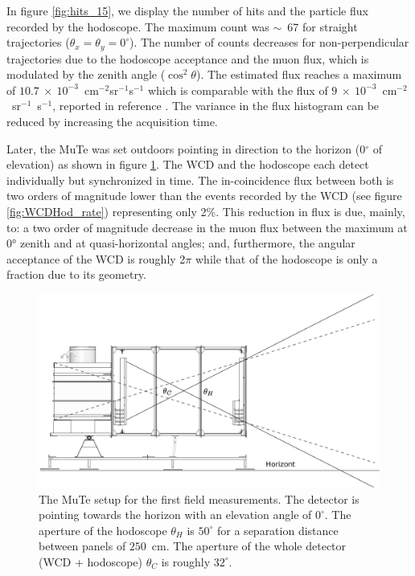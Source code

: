 \documentclass[letterpaper,11pt]{article}
\begin{document}
In figure \ref{fig:hits_15}, we display the number of hits and the particle flux recorded by the hodoscope. The maximum count was $\sim$~67 for straight trajectories ($\theta_x=\theta_y=0^{\circ}$). The number of counts decreases for non-perpendicular trajectories due to the hodoscope acceptance and the muon flux, which is modulated by the zenith angle ($\cos^2 \theta$). The estimated flux reaches a maximum of $10.7~\times~10^{-3}$~cm$^{-2}$sr$^{-1}$s$^{-1}$ which is comparable with the flux of $9~\times~10^{-3}$~cm$^{-2}$~sr$^{-1}$~s$^{-1}$, reported in reference \cite{Lesparre2012} . The variance in the flux histogram can be reduced by increasing the acquisition time.
 
Later, the MuTe was set outdoors pointing in direction to the horizon (0$^{\circ}$ of elevation) as shown in figure \ref{fig:WCDHod}. The WCD and the hodoscope each detect individually but synchronized in time. The in-coincidence flux between both is two orders of magnitude lower than the events recorded by the WCD (see figure \ref{fig:WCDHod_rate}) representing only 2$\%$. This reduction in flux is due, mainly, to:
a two order of magnitude decrease in the muon  flux between the maximum at 0° zenith and at quasi-horizontal angles;  and, furthermore, the angular acceptance of the WCD is roughly 2$\pi$ while that of the hodoscope is only a fraction due to its geometry.


\begin{figure}[htb]
\centering
\includegraphics[width=0.7\columnwidth]{Figures/Acceptance.eps}
\caption{The MuTe setup for the first field measurements. The detector is pointing towards the horizon with an elevation angle of $0^{\circ}$. The aperture of the hodoscope $\theta_H$ is $50^{\circ}$ for a separation distance between panels of $250$~cm. The aperture of the whole detector (WCD + hodoscope) $\theta_C$ is roughly $32^{\circ}$.}
\label{fig:WCDHod}
\end{figure}
\end{document}
